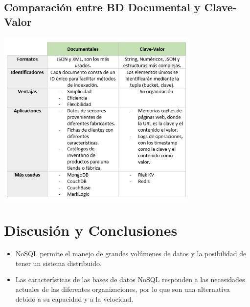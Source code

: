 \documentclass[%
 reprint,
 amsmath,amssymb,
 aps,
]{revtex4-1}
\begin{document}
\subsection{Comparación entre BD Documental y Clave-Valor}
		\begin{center}
		\includegraphics[width=10cm]{./Imagenes/cuadro}
		\end{center}	
\section{Discusión y Conclusiones}\label{sec:5}

	\begin{itemize}
		\item NoSQL permite el manejo de grandes volúmenes de datos y la posibilidad de tener un sistema distribuido.
		\item Las características de las bases de datos NoSQL responden a las necesidades actuales de las diferentes organizaciones, por lo que son una alternativa debido a su capacidad y a la velocidad.

	\end{itemize}





\end{document}
